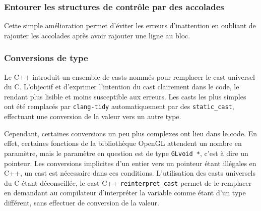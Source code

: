 \subsubsection{Entourer les structures de contrôle par des
accolades}\label{entourer-les-structures-de-contruxf4le-par-des-accolades}

Cette simple amélioration permet d'éviter les erreurs d'inattention en
oubliant de rajouter les accolades après avoir rajouter une ligne au
bloc.

\subsubsection{Conversions de type}\label{conversions-de-type}

Le C++ introduit un ensemble de casts nommés pour remplacer le cast
universel du C. L'objectif et d'exprimer l'intention du cast clairement
dans le code, le rendant plus lisible et moins susceptible aux erreurs.
Les casts les plus simples ont été remplacés par \texttt{clang-tidy}
automatiquement par des \texttt{static\_cast}, effectuant une conversion
de la valeur vers un autre type.

Cependant, certaines conversions un peu plus complexes ont lieu dans le
code. En effet, certaines fonctions de la bibliothèque OpenGL attendent
un nombre en paramètre, mais le paramètre en question est de type
\texttt{GLvoid\ *}, c'est à dire un pointeur. Les conversions implicites
d'un entier vers un pointeur étant illégales en C++, un cast est
nécessaire dans ces conditions.  L'utilisation des casts universels du C
étant déconseillée, le cast C++ \texttt{reinterpret\_cast} permet de le
remplacer en demandant au compilateur d'interpréter la variable comme
étant d'un type différent, sans effectuer de conversion de la valeur.


